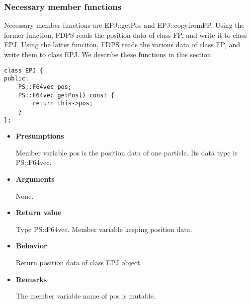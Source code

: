 \subsubsection{Necessary member functions}


Necessary member functions are EPJ::getPos and EPJ::copyfromFP. Using
the former function, FDPS reads the position data of class FP, and
write it to class EPJ. Using the latter funciton, FDPS reads the
various data of class FP, and write them to class EPJ. We describe
these functions in this section.


\begin{screen}
\begin{verbatim}
class EPJ {
public:
    PS::F64vec pos;
    PS::F64vec getPos() const {
        return this->pos;
    }
};
\end{verbatim}
\end{screen}

\begin{itemize}

\item {\bf Presumptions}
  
  Member variable pos is the position data of one particle. Its data
  type is PS::F64vec.
  
\item {\bf Arguments}

  None.
  
\item {\bf Return value}

  Type PS::F64vec. Member variable keeping position data.
  
\item {\bf Behavior}

  Return position data of class EPJ object.
  
\item {\bf Remarks}

  The member variable name of pos is mutable.

\end{itemize}


